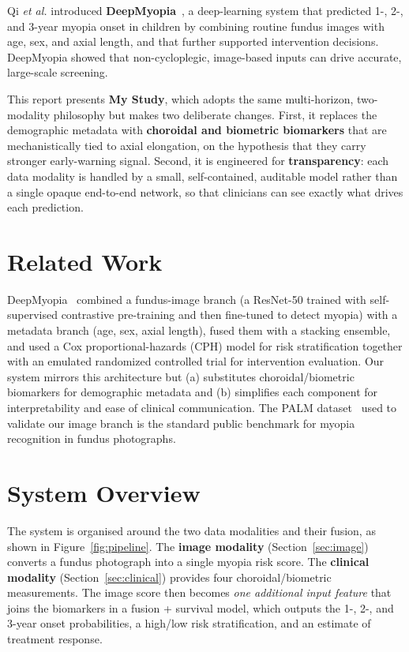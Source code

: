 \documentclass[11pt]{article}
\begin{document}
Qi \emph{et al.} introduced \textbf{DeepMyopia}~\cite{deepmyopia}, a deep-learning
system that predicted 1-, 2-, and 3-year myopia onset in children by combining
routine fundus images with age, sex, and axial length, and that further supported
intervention decisions. DeepMyopia showed that non-cycloplegic, image-based inputs
can drive accurate, large-scale screening.

This report presents \textbf{My Study}, which adopts the same multi-horizon,
two-modality philosophy but makes two deliberate changes. First, it replaces the
demographic metadata with \textbf{choroidal and biometric biomarkers} that are
mechanistically tied to axial elongation, on the hypothesis that they carry
stronger early-warning signal. Second, it is engineered for \textbf{transparency}:
each data modality is handled by a small, self-contained, auditable model rather
than a single opaque end-to-end network, so that clinicians can see exactly what
drives each prediction.

\section{Related Work}
DeepMyopia~\cite{deepmyopia} combined a fundus-image branch (a ResNet-50 trained
with self-supervised contrastive pre-training and then fine-tuned to detect
myopia) with a metadata branch (age, sex, axial length), fused them with a
stacking ensemble, and used a Cox proportional-hazards (CPH) model for risk
stratification together with an emulated randomized controlled trial for
intervention evaluation. Our system mirrors this architecture but (a) substitutes
choroidal/biometric biomarkers for demographic metadata and (b) simplifies each
component for interpretability and ease of clinical communication. The PALM
dataset~\cite{palm} used to validate our image branch is the standard public
benchmark for myopia recognition in fundus photographs.

\section{System Overview}
The system is organised around the two data modalities and their fusion, as shown
in Figure~\ref{fig:pipeline}. The \textbf{image modality} (Section~\ref{sec:image})
converts a fundus photograph into a single myopia risk score. The \textbf{clinical
modality} (Section~\ref{sec:clinical}) provides four choroidal/biometric
measurements. The image score then becomes \emph{one additional input feature}
that joins the biomarkers in a fusion + survival model, which outputs the 1-, 2-,
and 3-year onset probabilities, a high/low risk stratification, and an estimate of
treatment response.
\end{document}
